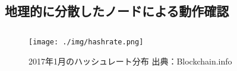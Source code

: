 \subsection{地理的に分散したノードによる動作確認}

\subsection{}

\subsection{}

\begin{figure}[h]
    \begin{center}
        \texttt{[image: ./img/hashrate.png]}
        \caption{2017年1月のハッシュレート分布 出典：Blockchain.info\cite{bitcoinhashrate}}
        \label{img:hashrate}
    \end{center}
\end{figure}
\fi
